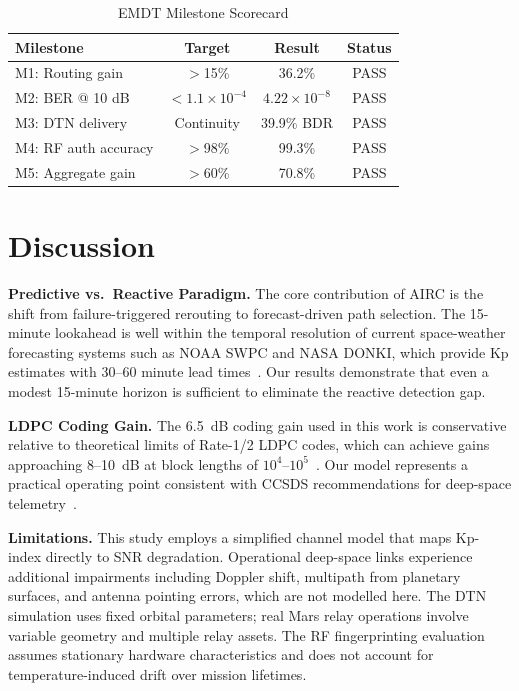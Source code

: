 \documentclass[journal]{IEEEtran}
\begin{document}
\begin{table}[!t]
\centering
\caption{EMDT Milestone Scorecard}
\label{tab:scorecard}
\begin{tabular}{lccc}
\toprule
\textbf{Milestone} & \textbf{Target} & \textbf{Result} & \textbf{Status} \\
\midrule
M1: Routing gain     & $>$15\%               & 36.2\%                          & PASS \\
M2: BER @ 10 dB      & $<1.1\!\times\!10^{-4}$ & $4.22\!\times\!10^{-8}$         & PASS \\
M3: DTN delivery     & Continuity            & 39.9\% BDR                      & PASS \\
M4: RF auth accuracy & $>$98\%               & 99.3\%                          & PASS \\
M5: Aggregate gain   & $>$60\%               & 70.8\%                          & PASS \\
\bottomrule
\end{tabular}
\end{table}



\section{Discussion}

\textbf{Predictive vs.\ Reactive Paradigm.}
The core contribution of AIRC is the shift from failure-triggered rerouting to forecast-driven path selection.
The 15-minute lookahead is well within the temporal resolution of current space-weather forecasting systems such as NOAA SWPC and NASA DONKI, which provide Kp estimates with 30--60 minute lead times~\cite{schrijver2015solar}.
Our results demonstrate that even a modest 15-minute horizon is sufficient to eliminate the reactive detection gap.

\textbf{LDPC Coding Gain.}
The 6.5~dB coding gain used in this work is conservative relative to theoretical limits of Rate-1/2 LDPC codes, which can achieve gains approaching 8--10~dB at block lengths of $10^4$--$10^5$~\cite{richardson2008modern}.
Our model represents a practical operating point consistent with CCSDS recommendations for deep-space telemetry~\cite{ccsds2020ldpc}.

\textbf{Limitations.}
This study employs a simplified channel model that maps Kp-index directly to SNR degradation.
Operational deep-space links experience additional impairments including Doppler shift, multipath from planetary surfaces, and antenna pointing errors, which are not modelled here.
The DTN simulation uses fixed orbital parameters; real Mars relay operations involve variable geometry and multiple relay assets.
The RF fingerprinting evaluation assumes stationary hardware characteristics and does not account for temperature-induced drift over mission lifetimes.
\end{document}

